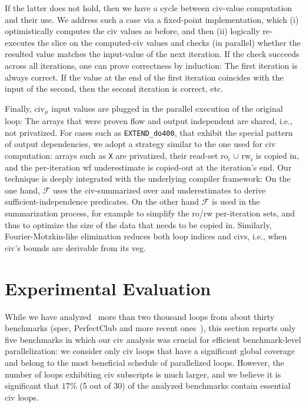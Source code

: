 \documentclass[10pt,nocopyrightspace]{sigplanconf}
\begin{document}
If the latter does not hold,  
then we have a cycle between {\sc civ}-value computation and their use.   
We address such a case via a fixed-point implementation,
which (i) optimistically computes the {\sc civ} values as before, and then (ii) logically 
re-executes the slice on the computed-{\sc civ} values and checks (in parallel) 
whether the resulted value matches the input-value of the next iteration. 
%
If the check succeeds across all iterations, one can prove correctness by induction:
The first iteration is always correct. If the value at the end of the first iteration 
coincides with the input of the second, then the second iteration 
is correct, etc.  

\enlargethispage{\baselineskip}

Finally, {\sc civ}$_\mu$ input values are plugged in the 
parallel execution of the original loop: The arrays that were proven flow and output
independent are shared, i.e., not privatized.   For cases such as {\tt EXTEND\_do400},
that exhibit the special pattern of output dependencies, we adopt a strategy similar
to the one used for {\sc civ} computation: arrays such as {\tt X} are privatized,
their read-set {\sc ro}$_i$ $\cup$ {\sc rw}$_i$ is copied in, and the per-iteration 
{\sc wf} underestimate
is copied-out at the iteration's end.   Our technique is deeply integrated with the
underlying compiler framework: On the one hand, $\mathcal{F}$ uses the {\sc civ}-summarized
over and underestimates to derive sufficient-independence predicates.
%
On the other hand $\mathcal{F}$ is used in the summarization process, for example 
to simplify the {\sc ro}/{\sc rw} per-iteration sets, and thus to optimize the 
size of the data that needs to be copied in.  Similarly, Fourier-Motzkin-like
elimination reduces both loop indices and {\sc civ}s, i.e., when {\sc civ}'s 
bounds are derivable from its {\sc veg}.



\section{Experimental Evaluation}
\label{sec:EmpEval}

While we have analyzed~\cite{CosPLDI} more than two thousand loops from about thirty 
benchmarks ({\sc spec}, {\sc PerfectClub} and more recent ones~\cite{LexiFiPricing}), 
this section reports only five benchmarks in which our {\sc civ} analysis was crucial 
for efficient benchmark-level parallelization: we consider only 
{\sc civ} loops that have a significant global coverage and belong to the most
beneficial schedule of parallelized loops.   However, the number
of loops exhibiting {\sc civ} subscripts is much larger, and we believe
it is significant that $17\%$ (5 out of 30) of the analyzed benchmarks contain 
essential {\sc civ} loops. 
\end{document}
